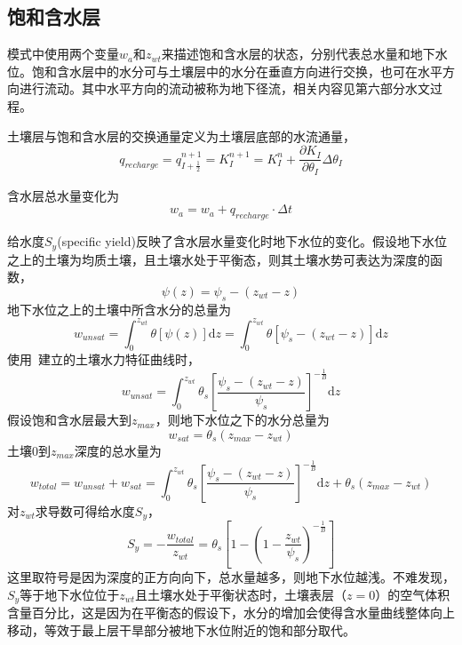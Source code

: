 \subsection{饱和含水层}
模式中使用两个变量$w_a$和$z_{wt}$来描述饱和含水层的状态，分别代表总水量和地下水位。饱和含水层中的水分可与土壤层中的水分在垂直方向进行交换，也可在水平方向进行流动。其中水平方向的流动被称为地下径流，相关内容见第六部分水文过程。

土壤层与饱和含水层的交换通量定义为土壤层底部的水流通量，
\begin{equation}
{q}_{recharge}=q_{I+\frac{1}{2}}^{n+1}=K_{I}^{n+1} = K_I^n + \frac{\partial K_{I}}{\partial \theta_{I}} \Delta \theta_{I}
\end{equation}

含水层总水量变化为
\begin{equation}
w_{a}=w_{a}+q_{recharge} \cdot \Delta t
\end{equation}

给水度$S_y$(specific yield)反映了含水层水量变化时地下水位的变化。假设地下水位之上的土壤为均质土壤，且土壤水处于平衡态，则其土壤水势可表达为深度的函数，
\begin{equation}
    \psi \left(z\right) = \psi_s - \left(z_{wt} - z\right)
\end{equation}
地下水位之上的土壤中所含水分的总量为
\begin{equation}
    w_{unsat} = \int^{z_{wt}}_0 \theta\left[\psi\left(z\right)\right] \mathrm{d}z = \int^{z_{wt}}_0 \theta\left[\psi_s - \left(z_{wt} - z\right)\right] \mathrm{d}z
\end{equation}
使用~\citet{campbell1974}建立的土壤水力特征曲线时，
\begin{equation}
    w_{unsat} = \int^{z_{wt}}_0 \theta_s\left[\frac{\psi_s - \left(z_{wt} - z\right)}{\psi_s}\right]^{-\frac{1}{B}} \mathrm{d}z
\end{equation}
假设饱和含水层最大到$z_{max}$，则地下水位之下的水分总量为
\begin{equation}
w_{sat} = \theta_s\left(z_{max}-z_{wt}\right)
\end{equation}
土壤$0$到$z_{max}$深度的总水量为
\begin{equation}
    w_{total} = w_{unsat} + w_{sat} = \int^{z_{wt}}_0 \theta_s\left[\frac{\psi_s - \left(z_{wt} - z\right)}{\psi_s}\right]^{-\frac{1}{B}} \mathrm{d}z + \theta_s\left(z_{max}-z_{wt}\right)
\end{equation}
对$z_{wt}$求导数可得给水度$S_y$，
\begin{equation}
{S}_{{y}} = -\frac{w_{total}}{z_{wt}} = \theta_{s}\left[1-\left(1-\frac{z_{w t}}{\psi_{s}}\right)^{-\frac{1}{B}}\right] \label{eqn:s_y}
\end{equation}
这里取符号是因为深度的正方向向下，总水量越多，则地下水位越浅。不难发现，$S_y$等于地下水位位于$z_{wt}$且土壤水处于平衡状态时，土壤表层（$z=0$）的空气体积含量百分比，这是因为在平衡态的假设下，水分的增加会使得含水量曲线整体向上移动，等效于最上层干旱部分被地下水位附近的饱和部分取代。

